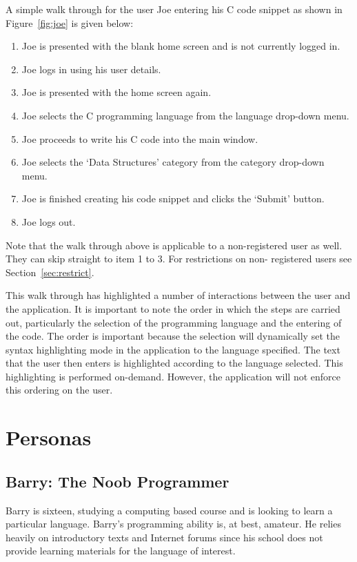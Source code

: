 \documentclass[11pt,a4paper]{article}
\begin{document}
A simple walk through for the user Joe entering his C code snippet as
shown in Figure~\ref{fig:joe} is given below:

\begin{enumerate}
\item Joe is presented with the blank home screen and is not currently logged
in.
\item Joe logs in using his user details.
\item Joe is presented with the home screen again.
\item Joe selects the C programming language from the language drop-down
menu.
\item Joe proceeds to write his C code into the main window.
\item Joe selects the `Data Structures' category from the category
drop-down menu.
\item Joe is finished creating his code snippet and clicks the `Submit'
button.
\item Joe logs out.
\end{enumerate}

Note that the walk through above is applicable to a non-registered user
as well. They can skip straight to item 1 to 3. For restrictions on non-
registered users see Section~\ref{sec:restrict}.

This walk through has highlighted a number of interactions between the
user and the application. It is important to note the order in which
the steps are carried out, particularly the selection of the
programming language and the entering of the code. The order is
important because the selection will dynamically set the syntax
highlighting mode in the application to the language specified.
The text that the user then enters is highlighted according to the
language selected. This highlighting is performed on-demand. %
However, the application will not enforce this ordering on the user.

\newpage

\section{Personas}

\subsection{Barry: The Noob Programmer}
\label{sec:barry} 

Barry is sixteen, studying a computing based course and is looking to
learn a particular language. Barry's programming ability is, at best,
amateur. He relies heavily on introductory texts and Internet forums
since his school does not provide learning materials for the language
of interest.
\end{document}
